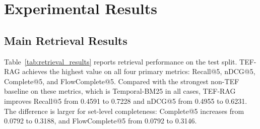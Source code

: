 \section{Experimental Results}
\label{sec:results}

\subsection{Main Retrieval Results}

Table~\ref{tab:retrieval_results} reports retrieval performance on the test split.
TEF-RAG achieves the highest value on all four primary metrics: Recall@5, nDCG@5, Complete@5, and FlowComplete@5.
Compared with the strongest non-TEF baseline on these metrics, which is Temporal-BM25 in all cases,
TEF-RAG improves Recall@5 from 0.4591 to 0.7228 and nDCG@5 from 0.4955 to 0.6231.
The difference is larger for set-level completeness: Complete@5 increases from 0.0792 to 0.3188, and FlowComplete@5 from 0.0792 to 0.3146.

\begin{table}[t]
\caption{Main retrieval results on the test split (Top-5).}
\label{tab:retrieval_results}
\centering
\small
\setlength{\tabcolsep}{3pt}
\end{table}

